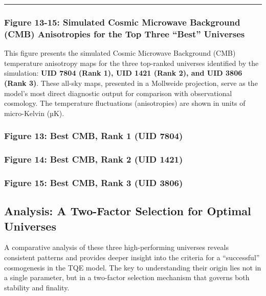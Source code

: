 \begin{center}\rule{0.5\linewidth}{0.5pt}\end{center}

\subsubsection{Figure 13-15: Simulated Cosmic Microwave Background (CMB)
Anisotropies for the Top Three ``Best''
Universes}\label{figure-13-15-simulated-cosmic-microwave-background-cmb-anisotropies-for-the-top-three-best-universes}

This figure presents the simulated Cosmic Microwave Background (CMB)
temperature anisotropy maps for the three top-ranked universes
identified by the simulation: \textbf{UID 7804 (Rank 1), UID 1421 (Rank
2), and UID 3806 (Rank 3)}. These all-sky maps, presented in a Mollweide
projection, serve as the model's most direct diagnostic output for
comparison with observational cosmology. The temperature fluctuations
(anisotropies) are shown in units of micro-Kelvin (µK).

\subsubsection{Figure 13: Best CMB, Rank 1 (UID
7804)}\label{figure-13-best-cmb-rank-1-uid-7804}

\subsubsection{Figure 14: Best CMB, Rank 2 (UID
1421)}\label{figure-14-best-cmb-rank-2-uid-1421}

\subsubsection{Figure 15: Best CMB, Rank 3 (UID
3806)}\label{figure-15-best-cmb-rank-3-uid-3806}

\subsection{Analysis: A Two-Factor Selection for Optimal
Universes}\label{analysis-a-two-factor-selection-for-optimal-universes}

A comparative analysis of these three high-performing universes reveals
consistent patterns and provides deeper insight into the criteria for a
``successful'' cosmogenesis in the TQE model. The key to understanding
their origin lies not in a single parameter, but in a two-factor
selection mechanism that governs both stability and finality.

